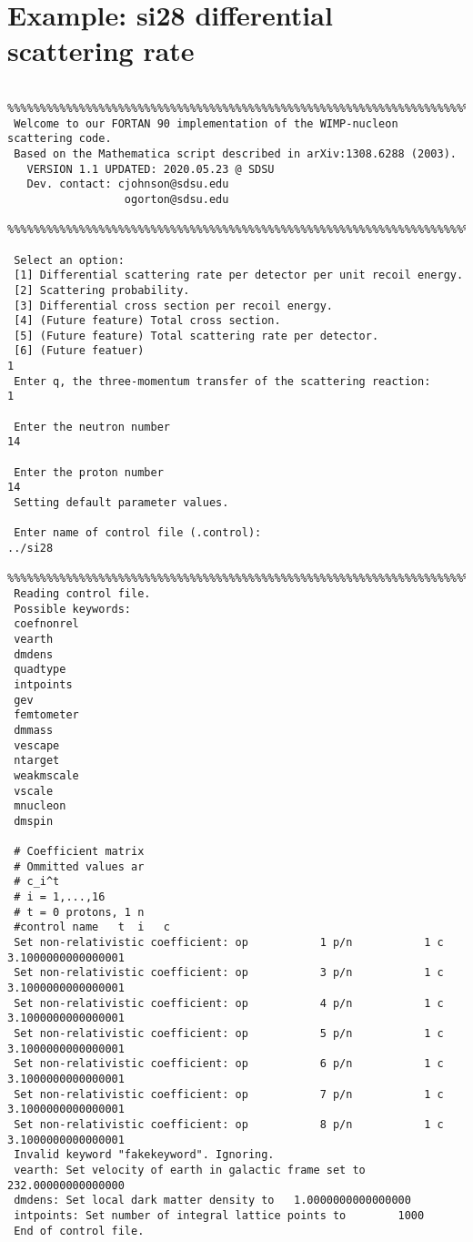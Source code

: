 \documentclass[11pt]{amsart}
\begin{document}
\section{Example: si28 differential scattering rate}

\begin{verbatim}
 %%%%%%%%%%%%%%%%%%%%%%%%%%%%%%%%%%%%%%%%%%%%%%%%%%%%%%%%%%%%%%%%%%%%%%%%%%%%%%%
 Welcome to our FORTAN 90 implementation of the WIMP-nucleon scattering code.
 Based on the Mathematica script described in arXiv:1308.6288 (2003).
   VERSION 1.1 UPDATED: 2020.05.23 @ SDSU
   Dev. contact: cjohnson@sdsu.edu
                  ogorton@sdsu.edu
 %%%%%%%%%%%%%%%%%%%%%%%%%%%%%%%%%%%%%%%%%%%%%%%%%%%%%%%%%%%%%%%%%%%%%%%%%%%%%%%
 
 Select an option:
 [1] Differential scattering rate per detector per unit recoil energy.
 [2] Scattering probability.
 [3] Differential cross section per recoil energy.
 [4] (Future feature) Total cross section.
 [5] (Future feature) Total scattering rate per detector.
 [6] (Future featuer) 
1
 Enter q, the three-momentum transfer of the scattering reaction:
1
  
 Enter the neutron number 
14
  
 Enter the proton number 
14
 Setting default parameter values.
  
 Enter name of control file (.control):
../si28
 %%%%%%%%%%%%%%%%%%%%%%%%%%%%%%%%%%%%%%%%%%%%%%%%%%%%%%%%%%%%%%%%%%%%%%%%%%%%%%%
 Reading control file.
 Possible keywords:
 coefnonrel          
 vearth              
 dmdens              
 quadtype            
 intpoints           
 gev                 
 femtometer          
 dmmass              
 vescape             
 ntarget             
 weakmscale          
 vscale              
 mnucleon            
 dmspin              
 
 # Coefficient matrix
 # Ommitted values ar
 # c_i^t             
 # i = 1,...,16      
 # t = 0 protons, 1 n
 #control name	 t	i	c
 Set non-relativistic coefficient: op           1 p/n           1 c   3.1000000000000001     
 Set non-relativistic coefficient: op           3 p/n           1 c   3.1000000000000001     
 Set non-relativistic coefficient: op           4 p/n           1 c   3.1000000000000001     
 Set non-relativistic coefficient: op           5 p/n           1 c   3.1000000000000001     
 Set non-relativistic coefficient: op           6 p/n           1 c   3.1000000000000001     
 Set non-relativistic coefficient: op           7 p/n           1 c   3.1000000000000001     
 Set non-relativistic coefficient: op           8 p/n           1 c   3.1000000000000001     
 Invalid keyword "fakekeyword". Ignoring.
 vearth: Set velocity of earth in galactic frame set to   232.00000000000000     
 dmdens: Set local dark matter density to   1.0000000000000000     
 intpoints: Set number of integral lattice points to        1000
 End of control file.
 

\end{verbatim}
\end{document}
